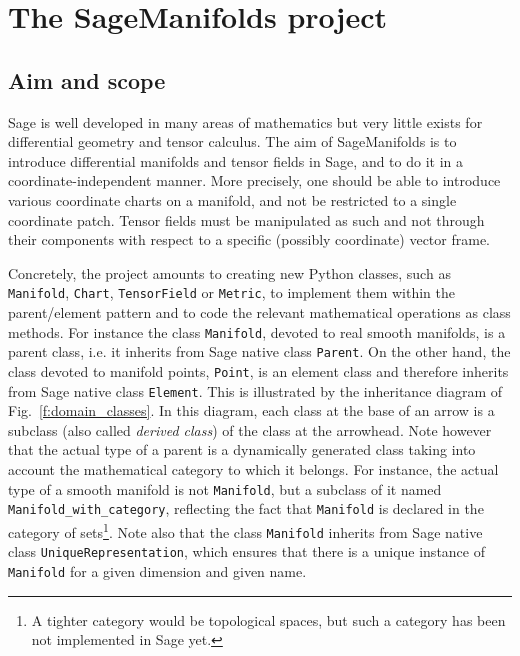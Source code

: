 \documentclass[a4paper]{jpconf}
\newcommand{\soft}[1]{\textsf{#1}}
\newcommand{\code}[1]{\texttt{#1}}
\newcommand{\Sage}{\soft{Sage}}
\newcommand{\SM}{\soft{SageManifolds}}
\begin{document}

\section{The SageManifolds project}

\subsection{Aim and scope}

\Sage{} is well developed in many areas of mathematics but 
very little exists for differential geometry and tensor calculus.
The aim of \SM{} \cite{SM} is to introduce differential manifolds and tensor fields
in \Sage{}, and to do it in a coordinate-independent manner. 
More precisely, one should be able to introduce various coordinate charts
on a manifold, and not be restricted to a single coordinate patch. 
Tensor fields must be manipulated as such and not through 
their components with respect to a specific (possibly coordinate) vector frame. 

Concretely, the project amounts to creating new Python classes,
 such as 
\code{Manifold}, \code{Chart}, \code{TensorField} or \code{Metric},
to implement them within the parent/element pattern and to 
code the relevant mathematical operations as class methods.
For instance the class \code{Manifold}, devoted to real smooth manifolds,
is a parent class, i.e. it inherits from Sage native class \code{Parent}.
On the other hand, the class devoted to manifold points, \code{Point}, 
is an element class and therefore inherits from Sage native class 
\code{Element}.
This is illustrated by the inheritance diagram of Fig.~\ref{f:domain_classes}.
In this diagram, each class at the base of an arrow is a subclass (also
called \emph{derived class}) of the class at the arrowhead.
Note however that the actual type of a parent is a dynamically generated
class taking into account the mathematical category to which it belongs. 
For instance, the actual type of a smooth manifold is not \code{Manifold}, but a
subclass of it named \code{Manifold\_with\_category}, 
reflecting the fact that \code{Manifold} is
declared in the category of sets\footnote{A tighter category would be
topological spaces, but such a category has been not implemented in \Sage{} yet.}.
Note also that the class \code{Manifold} inherits from \Sage{} native class
\texttt{UniqueRepresentation}, which ensures that there is a unique
instance of \code{Manifold} for a given dimension and given name. 
\end{document}
